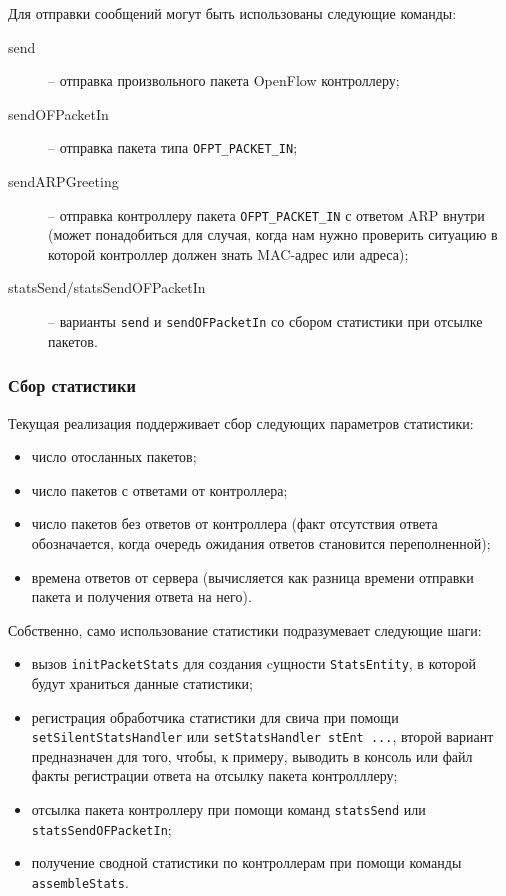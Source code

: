 \documentclass[9pt,a4paper]{article}
\begin{document}
Для отправки сообщений могут быть использованы следующие команды:

\begin{description}

  \item[send] -- отправка произвольного пакета OpenFlow контроллеру;

  \item[sendOFPacketIn] -- отправка пакета типа \lstinline!OFPT_PACKET_IN!;

  \item[sendARPGreeting] -- отправка контроллеру пакета \lstinline!OFPT_PACKET_IN!
    с ответом ARP внутри (может понадобиться для случая, когда нам нужно проверить
    ситуацию в которой контроллер должен знать MAC-адрес или адреса);

  \item[statsSend/statsSendOFPacketIn] -- варианты \lstinline!send! и
    \lstinline!sendOFPacketIn! со сбором статистики при отсылке пакетов.

\end{description}

\subsubsection{Сбор статистики}

Текущая реализация поддерживает сбор следующих параметров статистики:

\begin{itemize}
  \item число отосланных пакетов;
  \item число пакетов с ответами от контроллера;
  \item число пакетов без ответов от контроллера (факт отсутствия ответа обозначается,
    когда очередь ожидания ответов становится переполненной);
  \item времена ответов от сервера (вычисляется как разница времени отправки пакета
    и получения ответа на него).
\end{itemize}

Собственно, само использование статистики подразумевает следующие шаги:

\begin{itemize}
  \item вызов \lstinline!initPacketStats! для создания cущности \lstinline!StatsEntity!,
    в которой будут храниться данные статистики;
  \item регистрация обработчика статистики для свича при помощи 
    \lstinline!setSilentStatsHandler! или \lstinline!setStatsHandler stEnt ...!,
    второй вариант предназначен для того, чтобы, к примеру, выводить в консоль или
    файл факты регистрации ответа на отсылку пакета контролллеру;
  \item отсылка пакета контроллеру при помощи команд \lstinline!statsSend! или
    \lstinline!statsSendOFPacketIn!;
  \item получение сводной статистики по контроллерам при помощи команды
    \lstinline!assembleStats!.
\end{itemize}
\end{document}
